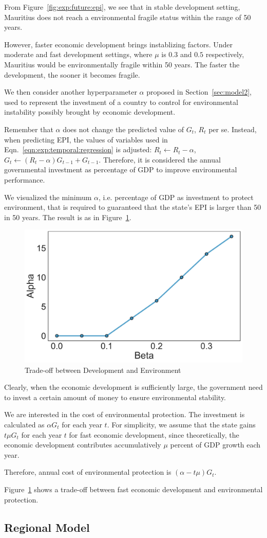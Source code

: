 From Figure~\ref{fig:exp:future:epi}, we see that in stable development setting, Mauritius does not reach a environmental fragile status within the range of 50 years.

However, faster economic development brings instablizing factors. Under moderate and fast development settings, where $\mu$ is $0.3$ and $0.5$ respectively, Mauritius would be environmentally fragile within 50 years. The faster the development, the sooner it becomes fragile.

We then consider another hyperparameter $\alpha$ proposed in Section~\ref{sec:model2}, used to represent the investment of a country to control for environmental instability possibly brought by economic development.

Remember that $\alpha$ does not change the predicted value of $G_t$, $R_t$ per se. Instead, when predicting EPI, the values of variables used in Eqn.~\ref{eqn:exp:temporal:regression} is adjusted: $R_t\leftarrow R_t-\alpha$, $G_t\leftarrow (R_t-\alpha)G_{t-1}+G_{t-1}$. Therefore, it is considered the annual governmental investment as percentage of GDP to improve environmental performance.

We visualized the minimum $\alpha$, i.e. percentage of GDP as investment to protect environment, that is required to guaranteed that the state's EPI is larger than 50 in 50 years. The result is as in Figure~\ref{fig:exp:tradeoff}.
\begin{figure}[htbp]
   \centering
   \includegraphics[width=.4\linewidth]{figs/tradeoff} 
   \caption{Trade-off between Development and Environment}
   \label{fig:exp:tradeoff}
\end{figure}

Clearly, when the economic development is sufficiently large, the government need to invest a certain amount of money to ensure environmental stability.

We are interested in the cost of environmental protection. The investment is calculated as $\alpha G_t$ for each year $t$. For simplicity, we assume that the state gains $t\mu G_t$ for each year $t$ for fast economic development, since theoretically, the economic development contributes accumulatively $\mu$ percent of GDP growth each year.

Therefore, annual cost of environmental protection is $(\alpha-t\mu)G_t$.

Figure~\ref{fig:exp:tradeoff} shows a trade-off between fast economic development and environmental protection. 

\subsection{Regional Model}
\label{sec:exp:regional}